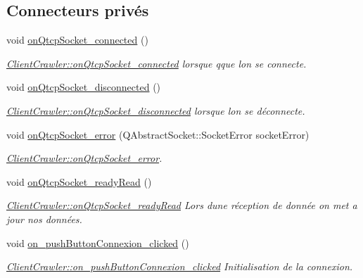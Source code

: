 \subsection*{Connecteurs privés}
\begin{DoxyCompactItemize}
\item 
void \hyperlink{class_client_crawler_a9e4023f18ce27d6e9a48275b28854a64}{on\+Qtcp\+Socket\+\_\+connected} ()
\begin{DoxyCompactList}\small\item\em \hyperlink{class_client_crawler_a9e4023f18ce27d6e9a48275b28854a64}{Client\+Crawler\+::on\+Qtcp\+Socket\+\_\+connected} lorsque qque l\textquotesingle{}on se connecte. \end{DoxyCompactList}\item 
void \hyperlink{class_client_crawler_a48418532d769b7a6826f59aa0bbff7cc}{on\+Qtcp\+Socket\+\_\+disconnected} ()
\begin{DoxyCompactList}\small\item\em \hyperlink{class_client_crawler_a48418532d769b7a6826f59aa0bbff7cc}{Client\+Crawler\+::on\+Qtcp\+Socket\+\_\+disconnected} lorsque l\textquotesingle{}on se déconnecte. \end{DoxyCompactList}\item 
void \hyperlink{class_client_crawler_a88ad5d8a6a1bd7a0b9cfcf4881be46e6}{on\+Qtcp\+Socket\+\_\+error} (Q\+Abstract\+Socket\+::\+Socket\+Error socket\+Error)
\begin{DoxyCompactList}\small\item\em \hyperlink{class_client_crawler_a88ad5d8a6a1bd7a0b9cfcf4881be46e6}{Client\+Crawler\+::on\+Qtcp\+Socket\+\_\+error}. \end{DoxyCompactList}\item 
void \hyperlink{class_client_crawler_a7e2e23f7d3b9e8ea84e3fbd3e88a7c56}{on\+Qtcp\+Socket\+\_\+ready\+Read} ()
\begin{DoxyCompactList}\small\item\em \hyperlink{class_client_crawler_a7e2e23f7d3b9e8ea84e3fbd3e88a7c56}{Client\+Crawler\+::on\+Qtcp\+Socket\+\_\+ready\+Read} Lors d\textquotesingle{}une réception de donnée on met a jour nos données. \end{DoxyCompactList}\item 
void \hyperlink{class_client_crawler_a0a5fe0345063d04e2c9acc5734b4a0d6}{on\+\_\+push\+Button\+Connexion\+\_\+clicked} ()
\begin{DoxyCompactList}\small\item\em \hyperlink{class_client_crawler_a0a5fe0345063d04e2c9acc5734b4a0d6}{Client\+Crawler\+::on\+\_\+push\+Button\+Connexion\+\_\+clicked} Initialisation de la connexion. \end{DoxyCompactList}\item 

\end{DoxyCompactItemize}
